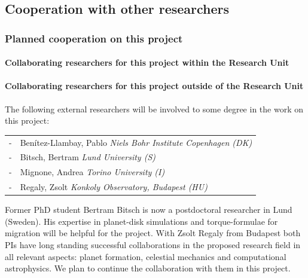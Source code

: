 \documentclass[10pt,fleqn,twoside]{article}
\begin{document}
\subsection{Cooperation with other researchers}

\subsubsection{Planned cooperation on this project}

\paragraph{Collaborating researchers for this project within the
  Research Unit}


\paragraph{Collaborating researchers for this project outside of
  the Research Unit}
The following external researchers will be involved to some degree in the work on this project:
\begin{center}
\begin{tabular}{cp{}}
 - & Ben\'itez-Llambay, Pablo \hfill {\em \small Niels Bohr Institute Copenhagen (DK)} \\[0.1cm]
 - & Bitsch, Bertram  \hfill {\em \small Lund University (S)} \\[0.1cm]
 - & Mignone, Andrea  \hfill {\em \small Torino University (I)} \\[0.1cm]
 - & Regaly, Zsolt \hfill {\em \small Konkoly Observatory, Budapest (HU)} \\[0.1cm]
\end{tabular}
\end{center}
Former PhD student Bertram Bitsch is now a postdoctoral researcher in Lund (Sweden). His expertise in planet-disk
simulations and torque-formulae for migration will be helpful for the project.
With Zsolt Regaly from Budapest both PIs have long standing successful collaborations in the
proposed research field in all relevant aspects: planet formation, celestial mechanics and computational astrophysics.
We plan to continue the collaboration with them in this project.
\end{document}
